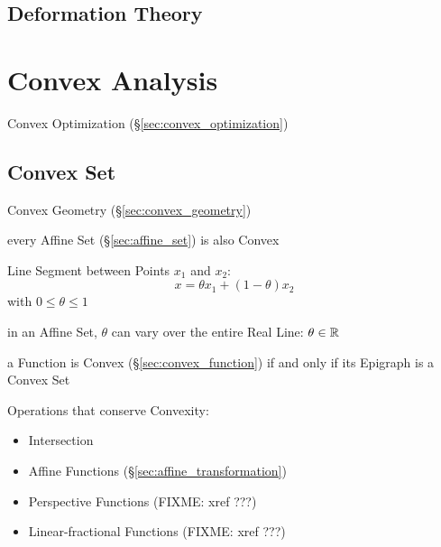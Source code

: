 {%
\subsection{Deformation Theory}\label{sec:deformation_theory}




\section{Convex Analysis}\label{sec:convex_analysis}

\fist Convex Optimization (\S\ref{sec:convex_optimization})



\subsection{Convex Set}\label{sec:convex_set}


\fist Convex Geometry (\S\ref{sec:convex_geometry})

every Affine Set (\S\ref{sec:affine_set}) is also Convex

Line Segment between Points $x_1$ and $x_2$:
\[
  x = \theta x_1 + (1-\theta) x_2
\]
with $0 \leq \theta \leq 1$

\fist in an Affine Set, $\theta$ can vary over the entire Real Line: $\theta
\in \mathbb{R}$

a Function is Convex (\S\ref{sec:convex_function}) if and only if its Epigraph
is a Convex Set

Operations that conserve Convexity:
\begin{itemize}
  \item Intersection
  \item Affine Functions (\S\ref{sec:affine_transformation})
  \item Perspective Functions (FIXME: xref ???)
  \item Linear-fractional Functions (FIXME: xref ???)
\end{itemize}

}
